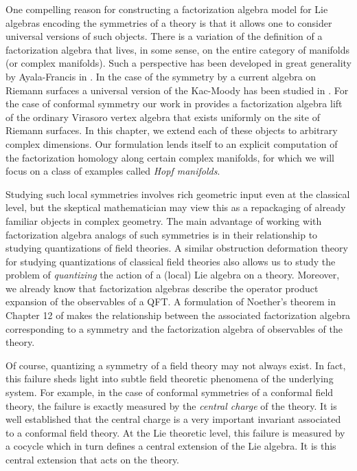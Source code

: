 \documentclass[10pt]{amsart}
\begin{document}
One compelling reason for constructing a factorization algebra model for Lie algebras encoding the symmetries of a theory is that it allows one to consider universal versions of such objects.
There is a variation of the definition of a factorization algebra that lives, in some sense, on the entire category of manifolds (or complex manifolds). 
Such a perspective has been developed in great generality by Ayala-Francis in \cite{AFTopMan}.
In the case of the symmetry by a current algebra on Riemann surfaces a universal version of the Kac-Moody has been studied in \cite{CG1}.
For the case of conformal symmetry our work in \cite{BWVir} provides a factorization algebra lift of the ordinary Virasoro vertex algebra that exists uniformly on the site of Riemann surfaces. 
In this chapter, we extend each of these objects to arbitrary complex dimensions.
Our formulation lends itself to an explicit computation of the factorization homology along certain complex manifolds, for which we will focus on a class of examples called {\em Hopf manifolds}.

Studying such local symmetries involves rich geometric input even at the classical level, but the skeptical mathematician may view this as a repackaging of already familiar objects in complex geometry.
The main advantage of working with factorization algebra analogs of such symmetries is in their relationship to studying quantizations of field theories.
A similar obstruction deformation theory for studying quantizations of classical field theories also allows us to study the problem of {\em quantizing} the action of a (local) Lie algebra on a theory.
Moreover, we already know that factorization algebras describe the operator product expansion of the observables of a QFT.
A formulation of Noether's theorem in Chapter 12 of \cite{CG2} makes the relationship between the associated factorization algebra corresponding to a symmetry and the factorization algebra of observables of the theory.

Of course, quantizing a symmetry of a field theory may not always exist.
In fact, this failure sheds light into subtle field theoretic phenomena of the underlying system. 
For example, in the case of conformal symmetries of a conformal field theory, the failure is exactly measured by the {\em central charge} of the theory. 
It is well established that the central charge is a very important invariant associated to a conformal field theory.
At the Lie theoretic level, this failure is measured by a cocycle which in turn defines a central extension of the Lie algebra. 
It is this central extension that acts on the theory. 
\end{document}
